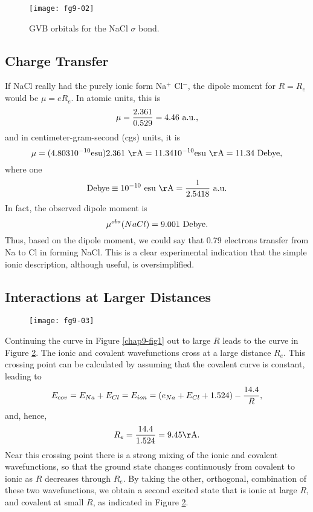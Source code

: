 \begin{figure}
\texttt{[image: fg9-02]}
\caption{GVB orbitals for the NaCl $\sigma$ bond.}
\label{chap9-fig2}
\end{figure}

\subsection{Charge Transfer}

If NaCl really had the purely ionic form Na$^+$ Cl$^-$,
the dipole moment for $R = R_e$ would be $\mu = eR_e$.  In atomic 
units, this is
$$
\mu = {2.361 \over 0.529} = 4.46 ~ {\rm a.u.},
$$
and in centimeter-gram-second (cgs) units, it is
$$
\mu = (4.80310^{-10} {\rm esu}) 2.361 ~ {\rm \AA} = 11.3410^{-10} 
{\rm esu} ~ {\rm \AA} = 11.34 ~ {\rm Debye},
$$
where one 
$$
{\rm Debye} \equiv 10^{-10} ~ {\rm esu ~ \AA} = {1 \over 2.5418} ~ {\rm 
a.u.}
$$
In fact, the observed dipole moment is
$$
\mu^{obs}(NaCl) = 9.001 ~ {\rm Debye}.
$$
Thus, based on the dipole moment, we could say that 0.79 electrons transfer 
from Na to Cl in forming NaCl.  This is a clear experimental indication 
that the simple ionic description, although useful, is oversimplified.

\subsection{Interactions at Larger Distances}

\begin{figure}
\texttt{[image: fg9-03]}
\caption{}
\label{chap9-fig3}
\end{figure}

Continuing the curve in Figure \ref{chap9-fig1} out to large $R$ leads
to the curve in Figure \ref{chap9-fig3}.  The ionic and covalent
wavefunctions cross at a large distance $R_e$.  This crossing point
can be calculated by assuming that the covalent curve is constant,
leading to
$$
E_{cov} = E_{Na} + E_{Cl} = E_{ion} = \left( e_{Na} + E_{Cl} + 1.524 
\right) - {14.4 \over R} ,
$$
and, hence,
$$
R_e = {14.4 \over 1.524} = 9.45 {\rm \AA} .
$$
Near this crossing point there is a strong mixing of the ionic and
covalent wavefunctions, so that the ground state changes continuously
from covalent to ionic as $R$ decreases through $R_e$.  By taking the
other, orthogonal, combination of these two wavefunctions, we obtain a
second excited state that is ionic at large $R$, and covalent at small
$R$, as indicated in Figure \ref{chap9-fig3}.

